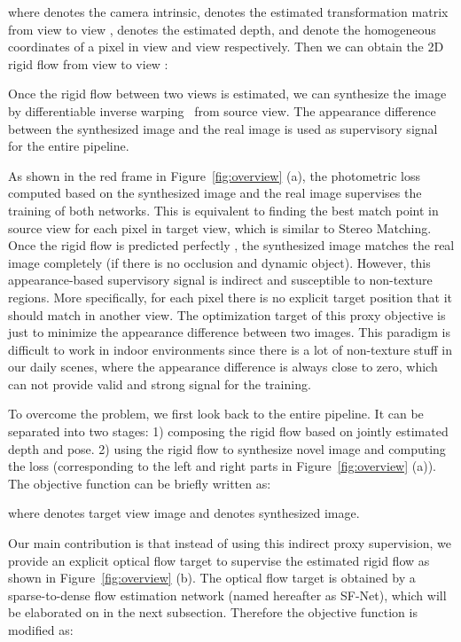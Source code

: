 \documentclass[10pt,twocolumn,letterpaper]{article}
\begin{document}
where  denotes the camera intrinsic,  denotes the estimated transformation matrix from view  to view ,  denotes the estimated depth,  and  denote the homogeneous coordinates of a pixel in view  and view  respectively. Then we can obtain the 2D rigid flow from view  to view :


Once the rigid flow between two views is estimated, we can synthesize the image  by differentiable inverse warping~\cite{jaderberg2015spatial} from source view. The appearance difference between the synthesized image  and the real image  is used as supervisory signal for the entire pipeline.

As shown in the red frame in Figure~\ref{fig:overview} (a), the photometric loss computed based on the synthesized image and the real image supervises the training of both networks. This is equivalent to finding the best match point in source view for each pixel in target view, which is similar to Stereo Matching. Once the rigid flow is predicted perfectly , the synthesized image matches the real image completely (if there is no occlusion and dynamic object). However, this appearance-based supervisory signal is indirect and susceptible to non-texture regions. More specifically, for each pixel there is no explicit target position that it should match in another view. The optimization target of this proxy objective is just to minimize the appearance difference between two images. This paradigm is difficult to work in indoor environments since there is a lot of non-texture stuff in our daily scenes, where the appearance difference is always close to zero, which can not provide valid and strong signal for the training.

To overcome the problem, we first look back to the entire pipeline. It can be separated into two stages: 1) composing the rigid flow based on jointly estimated depth and pose. 2) using the rigid flow to synthesize novel image and computing the loss (corresponding to the left and right parts in Figure~\ref{fig:overview} (a)). The objective function can be briefly written as:


where  denotes target view image and  denotes synthesized image. 

Our main contribution is that instead of using this indirect proxy supervision, we provide an explicit optical flow target to supervise the estimated rigid flow as shown in Figure~\ref{fig:overview} (b). The optical flow target is obtained by a sparse-to-dense flow estimation network (named hereafter as SF-Net), which will be elaborated on in the next subsection. Therefore the objective function is modified as:
\end{document}
